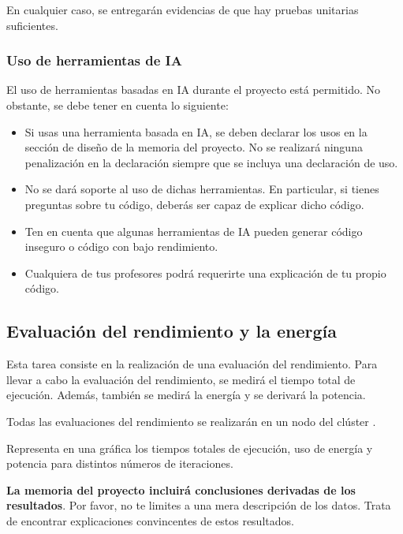 En cualquier caso, se entregarán evidencias de que hay pruebas unitarias
suficientes.

\subsubsection{Uso de herramientas de IA}

El uso de herramientas basadas en IA durante el proyecto está permitido.
No obstante, se debe tener en cuenta lo siguiente:

\begin{itemize}

\item Si usas una herramienta basada en IA, se deben declarar los usos en 
la sección de diseño de la memoria del proyecto. No se realizará ninguna
penalización en la declaración siempre que se incluya una declaración de uso.

\item No se dará soporte al uso de dichas herramientas. En particular,
si tienes preguntas sobre tu código, deberás ser capaz de explicar dicho
código.

\item Ten en cuenta que algunas herramientas de IA pueden generar código
inseguro o código con bajo rendimiento.

\item Cualquiera de tus profesores podrá requerirte una explicación de tu propio 
código.

\end{itemize}

\subsection{Evaluación del rendimiento y la energía}

Esta tarea consiste en la realización de una evaluación del rendimiento.
Para llevar a cabo la evaluación del rendimiento, se medirá el tiempo total
de ejecución. Además, también se medirá la energía y se derivará la potencia.

Todas las evaluaciones del rendimiento se realizarán en un nodo del clúster
.

Representa en una gráfica los tiempos totales de ejecución, uso de energía y
potencia para distintos números de iteraciones.

\textbf{La memoria del proyecto incluirá conclusiones derivadas de los
resultados}.
Por favor, no te limites a una mera descripción de los datos.
Trata de encontrar explicaciones convincentes de estos resultados.

